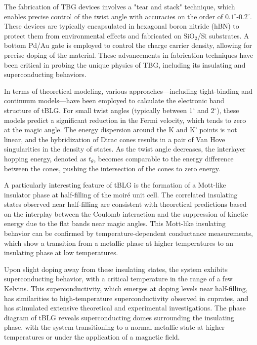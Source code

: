 The fabrication of TBG devices involves a "tear and stack" technique, which enables precise control of the twist angle with accuracies on the order of \(0.1^\circ\)-\(0.2^\circ\). These devices are typically encapsulated in hexagonal boron nitride (hBN) to protect them from environmental effects and fabricated on SiO\(_2\)/Si substrates. A bottom Pd/Au gate is employed to control the charge carrier density, allowing for precise doping of the material. These advancements in fabrication techniques have been critical in probing the unique physics of TBG, including its insulating and superconducting behaviors.

\n\n\n

In terms of theoretical modeling, various approaches—including tight-binding and continuum models—have been employed to calculate the electronic band structure of tBLG. For small twist angles (typically between 1$^\circ$ and 2$^\circ$), these models predict a significant reduction in the Fermi velocity, which tends to zero at the magic angle. The energy dispersion around the K and K' points is not linear, and the hybridization of Dirac cones results in a pair of Van Hove singularities in the density of states. As the twist angle decreases, the interlayer hopping energy, denoted as \(t_\theta\), becomes comparable to the energy difference between the cones, pushing the intersection of the cones to zero energy.

A particularly interesting feature of tBLG is the formation of a Mott-like insulator phase at half-filling of the moiré unit cell. The correlated insulating states observed near half-filling are consistent with theoretical predictions based on the interplay between the Coulomb interaction and the suppression of kinetic energy due to the flat bands near magic angles. This Mott-like insulating behavior can be confirmed by temperature-dependent conductance measurements, which show a transition from a metallic phase at higher temperatures to an insulating phase at low temperatures.

Upon slight doping away from these insulating states, the system exhibits superconducting behavior, with a critical temperature in the range of a few Kelvins. This superconductivity, which emerges at doping levels near half-filling, has similarities to high-temperature superconductivity observed in cuprates, and has stimulated extensive theoretical and experimental investigations. The phase diagram of tBLG reveals superconducting domes surrounding the insulating phase, with the system transitioning to a normal metallic state at higher temperatures or under the application of a magnetic field.

